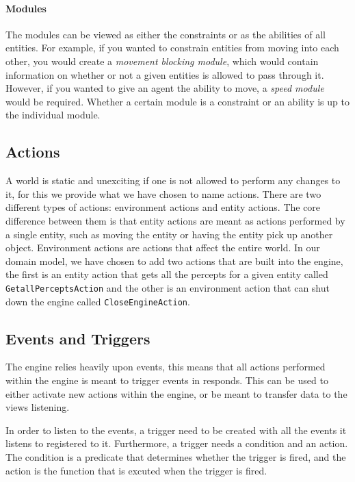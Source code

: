 \paragraph*{Modules}

The modules can be viewed as either the constraints or as the abilities
of all entities. For example, if you wanted to constrain entities
from moving into each other, you would create a \emph{movement blocking
module}, which would contain information on whether or not a given
entities is allowed to pass through it. However, if you wanted to
give an agent the ability to move, a \emph{speed module} would be
required. Whether a certain module is a constraint or an ability is
up to the individual module.


\subsection{Actions}

A world is static and unexciting if one is not allowed to perform
any changes to it, for this we provide what we have chosen to name
actions. There are two different types of actions: environment actions
and entity actions. The core difference between them is that entity
actions are meant as actions performed by a single entity, such as
moving the entity or having the entity pick up another object. Environment
actions are actions that affect the entire world. In our domain model,
we have chosen to add two actions that are built into the engine,
the first is an entity action that gets all the percepts for a given
entity called \texttt{GetallPerceptsAction} and the other is an environment
action that can shut down the engine called \texttt{CloseEngineAction}. 


\subsection{Events and Triggers}

The engine relies heavily upon events, this means that all actions
performed within the engine is meant to trigger events in responds.
This can be used to either activate new actions within the engine,
or be meant to transfer data to the views listening. 

In order to listen to the events, a trigger need to be created with
all the events it listens to registered to it. Furthermore, a trigger
needs a condition and an action. The condition is a predicate that
determines whether the trigger is fired, and the action is the function
that is excuted when the trigger is fired.
